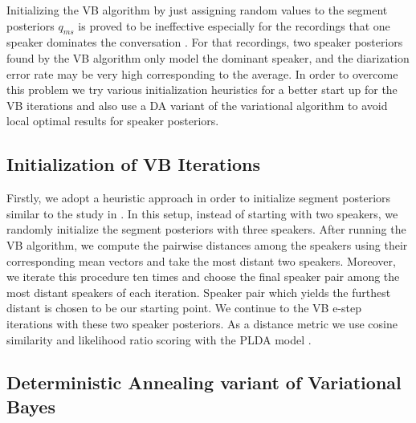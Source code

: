 \documentclass{article}
\begin{document}
Initializing the VB algorithm by just assigning random values to the segment posteriors $q_{ms}$ is proved to be ineffective especially for the recordings that one speaker dominates the conversation \cite{kenny2010diarFA}. For that recordings, two speaker posteriors found by the VB algorithm only model the dominant speaker, and the diarization error rate may be very high corresponding to the average. In order to overcome this problem we try various initialization heuristics for a better start up for the VB iterations and also use a DA variant of the variational algorithm to avoid local optimal results for speaker posteriors. 

\subsection{Initialization of VB Iterations}
\label{init_heur}

Firstly, we adopt a heuristic approach in order to initialize segment posteriors similar to the study in \cite{kenny2010diarFA}. In this setup, instead of starting with two speakers, we randomly initialize the segment posteriors with three speakers. After running the VB algorithm, we compute the pairwise distances among the speakers using their corresponding mean vectors and take the most distant two speakers. Moreover, we iterate this procedure ten times and choose the final speaker pair among the most distant speakers of each iteration. Speaker pair which yields the furthest distant is chosen to be our starting point. We continue to the VB e-step iterations with these two speaker posteriors. As a distance metric we use cosine similarity and likelihood ratio scoring with the PLDA model \cite{brummer2010twocov,prince2007PLDA}. 


\subsection{Deterministic Annealing variant of Variational Bayes}
\label{init_DA}
\end{document}
